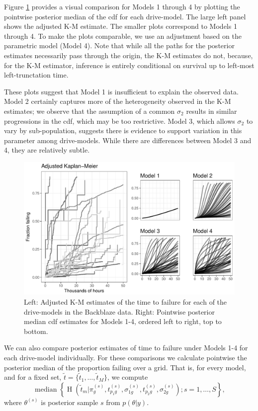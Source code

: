 \documentclass[11pt]{article}
\newcommand{\op}{\operatorname}
\begin{document}
Figure \ref{fig:fig2} provides a visual comparison for Models 1 through 4 by plotting the pointwise posterior median of the cdf for each drive-model.  The large left panel shows the adjusted K-M estimate.  The smaller plots correspond to Models 1 through 4.  To make the plots comparable, we use an adjustment based on the parametric model (Model 4).  Note that while all the paths for the posterior estimates necessarily pass through the origin, the K-M estimates do not, because, for the K-M estimator, inference is entirely conditional on survival up to left-most left-trunctation time.

These plots suggest that Model 1 is insufficient to explain the observed data. Model 2 certainly captures more of the heterogeneity observed in the K-M estimates; we observe that the assumption of a common $\sigma_2$ results in similar progressions in the cdf, which may be too restrictive. Model 3, which allows $\sigma_2$ to vary by sub-population, suggests there is evidence to support variation in this parameter among drive-models. While there are differences between Model 3 and 4, they are relatively subtle.

\begin{figure}[H]
\includegraphics[width=\textwidth]{heterogeneity-compare}
\caption{\footnotesize Left: Adjusted K-M estimates of the time to failure for each of the drive-models in the Backblaze data. Right: Pointwise posterior median cdf estimates for Models 1-4, ordered left to right, top to bottom.}
\label{fig:fig2}
\end{figure}

We can also compare posterior estimates of time to failure under Models 1-4 for each drive-model individually.  For these comparisons we calculate pointwise the posterior median of the proportion failing over a grid. That is, for every model, and for a fixed set, $\tilde{t}=\{\tilde{t}_1,\ldots,\tilde{t}_M\}$, we compute 
\begin{equation}
\label{pointwise-medians}
\op{median}\left\{\op{H}\left(\tilde{t}_m|\pi_{g}^{(s)},t_{p_{1}g}^{(s)},\sigma_{1g}^{(s)},t_{p_{2}g}^{(s)},\sigma_{2g}^{(s)}\right);s=1,\ldots,S \right\},
\end{equation}
where $\theta^{(s)}$ is posterior sample $s$ from $p(\theta|y)$.
\end{document}

